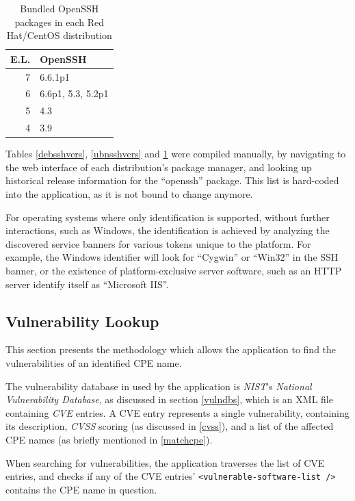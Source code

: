 \documentclass[a4paper,12pt]{article}
\begin{document}
	\begin{table}[H]
		\centering
		\begin{tabular}{|rl|}
			\hline
			\textbf{E.L.} & \textbf{OpenSSH} \\ \hline
			7 & 6.6.1p1 \\
			6 & 6.6p1, 5.3, 5.2p1 \\
			5 & 4.3 \\
			4 & 3.9 \\ \hline
		\end{tabular}
		\caption{Bundled OpenSSH packages in each Red Hat/CentOS distribution}
		\label{elsshvers}
	\end{table}
	
	Tables \ref{debsshvers}, \ref{ubnsshvers} and \ref{elsshvers} were compiled manually, by navigating to the web interface of each distribution's package manager, and looking up historical release information for the ``openssh'' package. This list is hard-coded into the application, as it is not bound to change anymore.
	
	For operating systems where only identification is supported, without further interactions, such as Windows, the identification is achieved by analyzing the discovered service banners for various tokens unique to the platform. For example, the Windows identifier will look for ``Cygwin'' or ``Win32'' in the SSH banner, or the existence of platform-exclusive server software, such as an HTTP server identify itself as ``Microsoft IIS''.
	
\subsection{Vulnerability Lookup}
 
	
	This section presents the methodology which allows the application to find the vulnerabilities of an identified CPE name.
	
	The vulnerability database in used by the application is \textit{NIST}'s \textit{National Vulnerability Database}, as discussed in section \ref{vulndbs}, which is an XML file containing \textit{CVE} entries. A CVE entry represents a single vulnerability, containing its description, \textit{CVSS} scoring (as discussed in \ref{cvss}), and a list of the affected CPE names (as briefly mentioned in \ref{matchcpe}).
	
	When searching for vulnerabilities, the application traverses the list of CVE entries, and checks if any of the CVE entries' \texttt{<vulnerable-software-list />} contains the CPE name in question.
	
\end{document}
